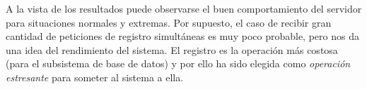 A la vista de los resultados puede observarse el buen comportamiento del servidor para situaciones normales y extremas. Por supuesto, el caso de recibir gran cantidad de peticiones de registro simultáneas es muy poco probable, pero nos da una idea del rendimiento del sistema. El registro es la operación más costosa (para el subsistema de base de datos) y por ello ha sido elegida como \emph{operación estresante} para someter al sistema a ella.






